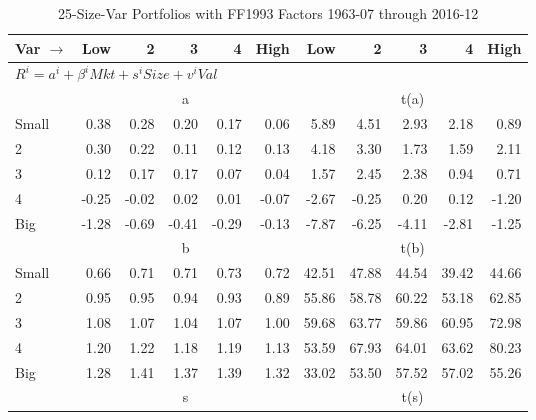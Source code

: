 
\begin{table}[!ht]
\centering
\caption{25-Size-Var Portfolios with FF1993 Factors 1963-07 through 2016-12}
\begin{tabular}{lrrrrrrrrrr}
  \toprule
    Var $\rightarrow$ & Low & 2 & 3 & 4 & High & Low & 2 & 3 & 4 & High \\ 
  \midrule
  \multicolumn{11}{l}{$R^i=a^i+\beta^iMkt+s^iSize+v^iVal$} \\

  
    
      & \multicolumn{5}{c}{a} & \multicolumn{5}{c}{t(a)}
    
    \\
      \cmidrule(r){2-6} \cmidrule(r){7-11}

    Small   & 0.38  & 0.28  & 0.20  & 0.17  & 0.06  & 5.89  & 4.51  & 2.93  & 2.18  & 0.89  \\
         2  & 0.30  & 0.22  & 0.11  & 0.12  & 0.13  & 4.18  & 3.30  & 1.73  & 1.59  & 2.11  \\
         3  & 0.12  & 0.17  & 0.17  & 0.07  & 0.04  & 1.57  & 2.45  & 2.38  & 0.94  & 0.71  \\
         4  & -0.25  & -0.02  & 0.02  & 0.01  & -0.07  & -2.67  & -0.25  & 0.20  & 0.12  & -1.20  \\
    Big     & -1.28  & -0.69  & -0.41  & -0.29  & -0.13  & -7.87  & -6.25  & -4.11  & -2.81  & -1.25  \\

  
    
      & \multicolumn{5}{c}{b} & \multicolumn{5}{c}{t(b)}
    
    \\
      \cmidrule(r){2-6} \cmidrule(r){7-11}

    Small   & 0.66  & 0.71  & 0.71  & 0.73  & 0.72  & 42.51  & 47.88  & 44.54  & 39.42  & 44.66  \\
         2  & 0.95  & 0.95  & 0.94  & 0.93  & 0.89  & 55.86  & 58.78  & 60.22  & 53.18  & 62.85  \\
         3  & 1.08  & 1.07  & 1.04  & 1.07  & 1.00  & 59.68  & 63.77  & 59.86  & 60.95  & 72.98  \\
         4  & 1.20  & 1.22  & 1.18  & 1.19  & 1.13  & 53.59  & 67.93  & 64.01  & 63.62  & 80.23  \\
    Big     & 1.28  & 1.41  & 1.37  & 1.39  & 1.32  & 33.02  & 53.50  & 57.52  & 57.02  & 55.26  \\

  
    
      & \multicolumn{5}{c}{s} & \multicolumn{5}{c}{t(s)}
    

\end{tabular}
\end{table}
